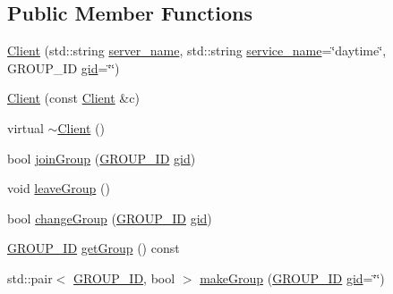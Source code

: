 \subsection*{Public Member Functions}
\begin{DoxyCompactItemize}
\item 
\hyperlink{classshaan97_1_1sync_1_1_client_aa9620e6828907c167babfc66a2926510}{Client} (std\+::string \hyperlink{classshaan97_1_1sync_1_1_client_a8edca95d3206d3c71bf851ad2dea7ec7}{server\+\_\+name}, std\+::string \hyperlink{classshaan97_1_1sync_1_1_client_a80e8c87abf08c599948d6464caa148e7}{service\+\_\+name}=\char`\"{}daytime\char`\"{}, G\+R\+O\+U\+P\+\_\+\+ID \hyperlink{classshaan97_1_1sync_1_1_client_a2708c76151616ac36af4aedecee5beb1}{gid}=\char`\"{}\char`\"{})
\item 
\hyperlink{classshaan97_1_1sync_1_1_client_a89f86d3ee0c7d60930276ff1a49fb203}{Client} (const \hyperlink{classshaan97_1_1sync_1_1_client}{Client} \&c)
\item 
virtual \hyperlink{classshaan97_1_1sync_1_1_client_a840e519ca781888cbd54181572ebe3a7}{$\sim$\+Client} ()
\item 
bool \hyperlink{classshaan97_1_1sync_1_1_client_afa6eb46eb9710b7ee9bbfaec0f70249b}{join\+Group} (\hyperlink{namespaceshaan97_1_1sync_a34cebf175d27dfc3d82f24608f7043c1}{G\+R\+O\+U\+P\+\_\+\+ID} \hyperlink{classshaan97_1_1sync_1_1_client_a2708c76151616ac36af4aedecee5beb1}{gid})
\item 
void \hyperlink{classshaan97_1_1sync_1_1_client_a9822f9f083442f323a8eda5cbe530523}{leave\+Group} ()
\item 
bool \hyperlink{classshaan97_1_1sync_1_1_client_a6afcf79c9a70dc1dee1e357f39343f91}{change\+Group} (\hyperlink{namespaceshaan97_1_1sync_a34cebf175d27dfc3d82f24608f7043c1}{G\+R\+O\+U\+P\+\_\+\+ID} \hyperlink{classshaan97_1_1sync_1_1_client_a2708c76151616ac36af4aedecee5beb1}{gid})
\item 
\hyperlink{namespaceshaan97_1_1sync_a34cebf175d27dfc3d82f24608f7043c1}{G\+R\+O\+U\+P\+\_\+\+ID} \hyperlink{classshaan97_1_1sync_1_1_client_abf8af45f2a8b6bf674357b6fc44fe3cc}{get\+Group} () const
\item 
std\+::pair$<$ \hyperlink{namespaceshaan97_1_1sync_a34cebf175d27dfc3d82f24608f7043c1}{G\+R\+O\+U\+P\+\_\+\+ID}, bool $>$ \hyperlink{classshaan97_1_1sync_1_1_client_a94a60773fd7d212132f44661acac59c7}{make\+Group} (\hyperlink{namespaceshaan97_1_1sync_a34cebf175d27dfc3d82f24608f7043c1}{G\+R\+O\+U\+P\+\_\+\+ID} \hyperlink{classshaan97_1_1sync_1_1_client_a2708c76151616ac36af4aedecee5beb1}{gid}=\char`\"{}\char`\"{})

\end{DoxyCompactItemize}
